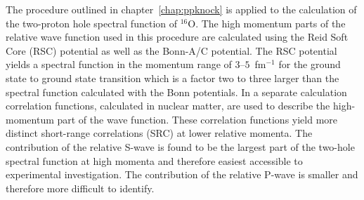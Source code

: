 \begin{WTabstract}%
The procedure outlined in chapter~\ref{chap:ppknock} is applied to  the 
calculation of the two-proton hole spectral function of ${}^{16}$O. The high
momentum parts of the relative wave function used in this procedure are
calculated using the Reid Soft Core (RSC) potential as well as the Bonn-A/C
potential. The RSC potential yields a 
spectral 
function in the momentum range of $3$--$5$~fm${}^{-1}$ for the 
ground state to ground state transition 
which is a factor two to three larger than the spectral function calculated
with the Bonn potentials. In a  separate calculation correlation 
functions, calculated in nuclear matter,  are  used to describe the 
high-momentum part of the wave function. These correlation functions  
yield more distinct
short-range correlations (SRC) at lower relative momenta.
The contribution of the 
relative S-wave is found to be the largest part 
of the two-hole spectral function at high momenta and therefore easiest 
accessible to experimental investigation. The contribution of the relative 
P-wave is smaller and therefore more difficult to identify.
\end{WTabstract}
